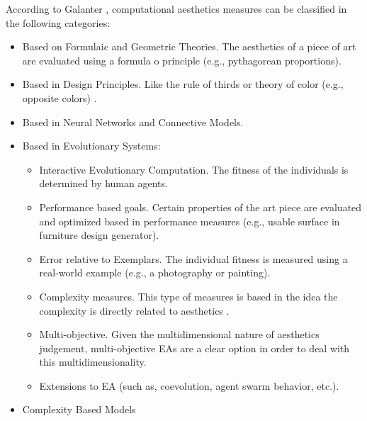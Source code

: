 \documentclass{llncs}
\begin{document}
According to Galanter \cite{galanter2012computational}, computational aesthetics measures can be classified in the following categories:
\begin{itemize}
	\item Based on Formulaic and Geometric Theories. The aesthetics of a piece of art are evaluated using a formula o principle (e.g., pythagorean proportions).
	\item Based in Design Principles. Like the rule of thirds or theory of color (e.g., opposite colors) \cite{den2012evolving}.
	\item Based in Neural Networks and Connective Models. 
	\item Based in Evolutionary Systems:
		\begin{itemize}
			\item Interactive Evolutionary Computation. The fitness of the individuals is determined by human agents.
			\item Performance based goals. Certain properties of the art piece are evaluated and optimized based in performance measures (e.g., usable surface in furniture design generator).
			\item Error relative to Exemplars. The individual fitness is measured using a real-world example (e.g., a photography or painting). \cite{dipaola2009incorporating}
			\item Complexity measures. This type of measures is based in the idea the complexity is directly related to aesthetics \cite{li2012investigating}.
			\item Multi-objective. Given the multidimensional nature of aesthetics judgement, multi-objective EAs are a clear option in order to deal with this multidimensionality.
			\item Extensions to EA (such as, coevolution, agent swarm behavior, etc.).
		\end{itemize}
	\item Complexity Based Models
\end{itemize}





\end{document}
